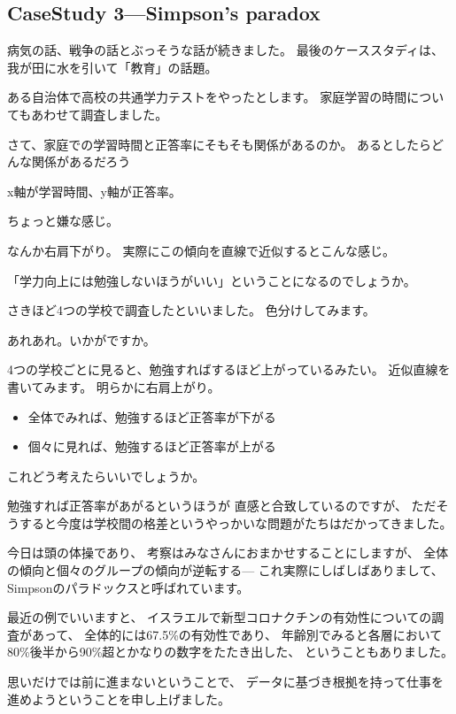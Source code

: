 \documentclass[uplatex,jis2004,dvipdfmx,12pt]{jsarticle}
\begin{document}
\subsection{CaseStudy 3---Simpson's paradox}


病気の話、戦争の話とぶっそうな話が続きました。
最後のケーススタディは、我が田に水を引いて「教育」の話題。


ある自治体で高校の共通学力テストをやったとします。
家庭学習の時間についてもあわせて調査しました。


さて、家庭での学習時間と正答率にそもそも関係があるのか。
あるとしたらどんな関係があるだろう



x軸が学習時間、y軸が正答率。

ちょっと嫌な感じ。

なんか右肩下がり。
実際にこの傾向を直線で近似するとこんな感じ。

「学力向上には勉強しないほうがいい」ということになるのでしょうか。

さきほど4つの学校で調査したといいました。
色分けしてみます。

あれあれ。いかがですか。

4つの学校ごとに見ると、勉強すればするほど上がっているみたい。
近似直線を書いてみます。
明らかに右肩上がり。


\begin{itemize}
 \item 全体でみれば、勉強するほど正答率が下がる
 \item 個々に見れば、勉強するほど正答率が上がる
\end{itemize}
これどう考えたらいいでしょうか。

勉強すれば正答率があがるというほうが
直感と合致しているのですが、
ただそうすると今度は学校間の格差というやっかいな問題がたちはだかってきました。

今日は頭の体操であり、
考察はみなさんにおまかせすることにしますが、
全体の傾向と個々のグループの傾向が逆転する---
これ実際にしばしばありまして、
Simpsonのパラドックスと呼ばれています。

最近の例でいいますと、
イスラエルで新型コロナクチンの有効性についての調査があって、
全体的には67.5\%の有効性であり、
年齢別でみると各層において80\%後半から90\%超とかなりの数字をたたき出した、
ということもありました。




思いだけでは前に進まないということで、
データに基づき根拠を持って仕事を進めようということを申し上げました。
\newpage
\end{document}
